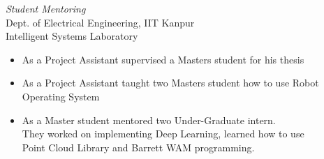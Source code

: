 \documentclass[margin,line]{resume}
\begin{document}
\begin{resume}






    \emph{Student Mentoring}\\
    Dept. of Electrical Engineering, IIT Kanpur\\
    Intelligent Systems Laboratory

    \begin{itemize}
    \item As a Project Assistant supervised a Masters student for his thesis
    \item As a Project Assistant taught two Masters student how to use Robot \\Operating System
    \item As a Master student mentored two Under-Graduate intern. \\They worked on implementing Deep Learning, learned how to use \\Point Cloud Library and Barrett WAM programming.
    \end{itemize}



\end{resume}
\end{document}
